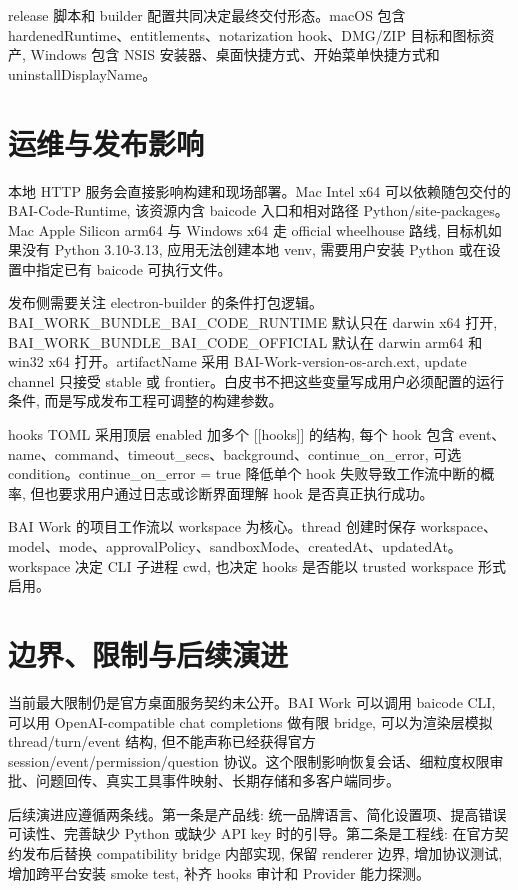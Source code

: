 release 脚本和 builder 配置共同决定最终交付形态。macOS 包含 hardenedRuntime、entitlements、notarization hook、DMG/ZIP 目标和图标资产, Windows 包含 NSIS 安装器、桌面快捷方式、开始菜单快捷方式和 uninstallDisplayName。

\section{运维与发布影响}
本地 HTTP 服务会直接影响构建和现场部署。Mac Intel x64 可以依赖随包交付的 BAI-Code-Runtime, 该资源内含 baicode 入口和相对路径 Python/site-packages。Mac Apple Silicon arm64 与 Windows x64 走 official wheelhouse 路线, 目标机如果没有 Python 3.10-3.13, 应用无法创建本地 venv, 需要用户安装 Python 或在设置中指定已有 baicode 可执行文件。

发布侧需要关注 electron-builder 的条件打包逻辑。BAI\_WORK\_BUNDLE\_BAI\_CODE\_RUNTIME 默认只在 darwin x64 打开, BAI\_WORK\_BUNDLE\_BAI\_CODE\_OFFICIAL 默认在 darwin arm64 和 win32 x64 打开。artifactName 采用 BAI-Work-{version}-{os}-{arch}.{ext}, update channel 只接受 stable 或 frontier。白皮书不把这些变量写成用户必须配置的运行条件, 而是写成发布工程可调整的构建参数。

hooks TOML 采用顶层 enabled 加多个 [[hooks]] 的结构, 每个 hook 包含 event、name、command、timeout\_secs、background、continue\_on\_error, 可选 condition。continue\_on\_error = true 降低单个 hook 失败导致工作流中断的概率, 但也要求用户通过日志或诊断界面理解 hook 是否真正执行成功。

BAI Work 的项目工作流以 workspace 为核心。thread 创建时保存 workspace、model、mode、approvalPolicy、sandboxMode、createdAt、updatedAt。workspace 决定 CLI 子进程 cwd, 也决定 hooks 是否能以 trusted workspace 形式启用。

\section{边界、限制与后续演进}
当前最大限制仍是官方桌面服务契约未公开。BAI Work 可以调用 baicode CLI, 可以用 OpenAI-compatible chat completions 做有限 bridge, 可以为渲染层模拟 thread/turn/event 结构, 但不能声称已经获得官方 session/event/permission/question 协议。这个限制影响恢复会话、细粒度权限审批、问题回传、真实工具事件映射、长期存储和多客户端同步。

后续演进应遵循两条线。第一条是产品线: 统一品牌语言、简化设置项、提高错误可读性、完善缺少 Python 或缺少 API key 时的引导。第二条是工程线: 在官方契约发布后替换 compatibility bridge 内部实现, 保留 renderer 边界, 增加协议测试, 增加跨平台安装 smoke test, 补齐 hooks 审计和 Provider 能力探测。


